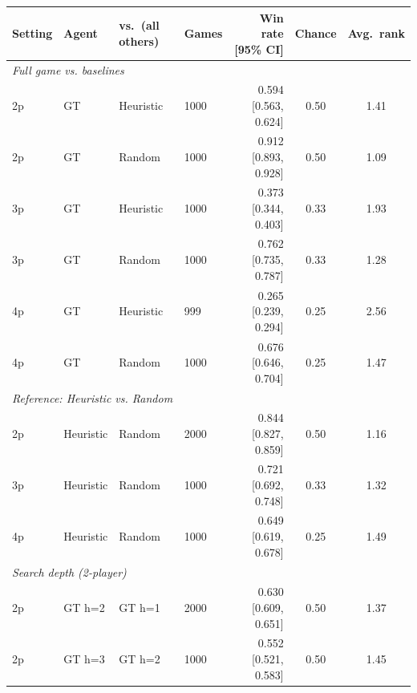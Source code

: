 \begin{tabular}{llllrcc}
\toprule
Setting & Agent & vs.\ (all others) & Games & Win rate [95\% CI] & Chance & Avg.\ rank\\
\midrule
\multicolumn{7}{l}{\emph{Full game vs. baselines}}\\
2p & GT & Heuristic & 1000 & 0.594 [0.563, 0.624] & 0.50 & 1.41\\
2p & GT & Random & 1000 & 0.912 [0.893, 0.928] & 0.50 & 1.09\\
3p & GT & Heuristic & 1000 & 0.373 [0.344, 0.403] & 0.33 & 1.93\\
3p & GT & Random & 1000 & 0.762 [0.735, 0.787] & 0.33 & 1.28\\
4p & GT & Heuristic & 999 & 0.265 [0.239, 0.294] & 0.25 & 2.56\\
4p & GT & Random & 1000 & 0.676 [0.646, 0.704] & 0.25 & 1.47\\
\multicolumn{7}{l}{\emph{Reference: Heuristic vs. Random}}\\
2p & Heuristic & Random & 2000 & 0.844 [0.827, 0.859] & 0.50 & 1.16\\
3p & Heuristic & Random & 1000 & 0.721 [0.692, 0.748] & 0.33 & 1.32\\
4p & Heuristic & Random & 1000 & 0.649 [0.619, 0.678] & 0.25 & 1.49\\
\multicolumn{7}{l}{\emph{Search depth (2-player)}}\\
2p & GT h=2 & GT h=1 & 2000 & 0.630 [0.609, 0.651] & 0.50 & 1.37\\
2p & GT h=3 & GT h=2 & 1000 & 0.552 [0.521, 0.583] & 0.50 & 1.45\\
\bottomrule
\end{tabular}
